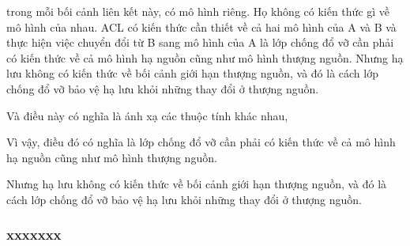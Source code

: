 \documentclass{article} %
\begin{document}

trong mỗi bối cảnh liên kết này, có mô hình riêng. Họ không có kiến thức gì về mô hình của nhau.
ACL có kiến thức cần thiết về cả hai mô hình của A và B và thực hiện việc chuyển đổi từ B sang mô hình của A là lớp chống đổ vỡ cần phải có kiến thức về cả mô hình hạ nguồn cũng như mô hình thượng nguồn.
Nhưng hạ lưu không có kiến thức về bối cảnh giới hạn thượng nguồn, và đó là cách lớp chống đổ vỡ bảo vệ hạ lưu khỏi những thay đổi ở thượng nguồn.









Và điều này có nghĩa là ánh xạ các thuộc tính khác nhau,

Vì vậy, điều đó có nghĩa là lớp chống đổ vỡ cần phải có kiến thức về cả mô hình hạ nguồn cũng như mô hình thượng nguồn.

Nhưng hạ lưu không có kiến thức về bối cảnh giới hạn thượng nguồn, và đó là cách lớp chống đổ vỡ bảo vệ hạ lưu khỏi những thay đổi ở thượng nguồn.

%
%


\subsubsection{xxxxxxx}
% 
\end{document}
